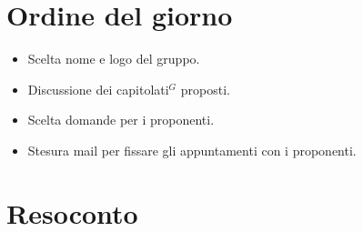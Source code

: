 \section{Ordine del giorno}

\begin{itemize}
    \item Scelta nome e logo del gruppo.
    \item Discussione dei capitolati$^{G}$ proposti.
    \item Scelta domande per i proponenti.
    \item Stesura mail per fissare gli appuntamenti con i proponenti.
\end{itemize}

\section{Resoconto}

